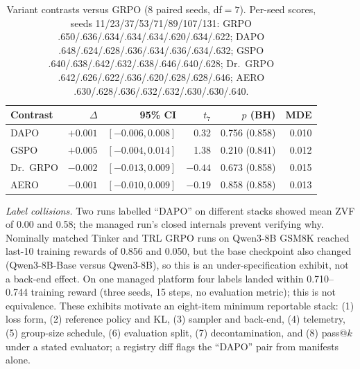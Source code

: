 \documentclass[conference]{IEEEtran}
\begin{document}
\begin{table}[t]
\caption{Variant contrasts versus GRPO (8 paired seeds, df$=7$). Per-seed
scores, seeds 11/23/37/53/71/89/107/131: GRPO
.650/.636/.634/.634/.634/.620/.634/.622; DAPO
.648/.624/.628/.636/.634/.636/.634/.632; GSPO
.640/.638/.642/.632/.638/.646/.640/.628; Dr.\ GRPO
.642/.626/.622/.636/.620/.628/.628/.646; AERO
.630/.628/.636/.632/.632/.630/.630/.640.}
\label{tab:variants}
\centering
\footnotesize
\setlength{\tabcolsep}{3pt}
\begin{tabular}{@{}lrrrrr@{}}
\toprule
Contrast & $\Delta$ & 95\% CI & $t_7$ & $p$ (BH) & MDE \\
\midrule
DAPO & $+0.001$ & $[-0.006,0.008]$ & 0.32 & 0.756 (0.858) & 0.010 \\
GSPO & $+0.005$ & $[-0.004,0.014]$ & 1.38 & 0.210 (0.841) & 0.012 \\
Dr.\ GRPO & $-0.002$ & $[-0.013,0.009]$ & $-0.44$ & 0.673 (0.858) & 0.015 \\
AERO & $-0.001$ & $[-0.010,0.009]$ & $-0.19$ & 0.858 (0.858) & 0.013 \\
\bottomrule
\end{tabular}
\end{table}

\emph{Label collisions.} Two runs labelled ``DAPO'' on different stacks
showed mean ZVF of 0.00 and 0.58; the managed run's closed internals
prevent verifying why. Nominally matched Tinker and TRL GRPO runs on
Qwen3-8B GSM8K reached last-10 training rewards of 0.856 and 0.050, but the
base checkpoint also changed (Qwen3-8B-Base versus Qwen3-8B), so this is an
under-specification exhibit, not a back-end effect. On one managed platform
four labels landed within 0.710--0.744 training reward (three seeds, 15
steps, no evaluation metric); this is not equivalence. These exhibits
motivate an eight-item minimum reportable stack: (1) loss form, (2)
reference policy and KL, (3) sampler and back-end, (4) telemetry, (5)
group-size schedule, (6) evaluation split, (7) decontamination, and (8)
pass@$k$ under a stated evaluator; a registry diff flags the ``DAPO'' pair
from manifests alone.
\end{document}
